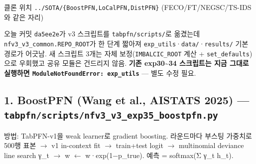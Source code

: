 \par\noindent \textbullet\enspace 클론 위치 \texttt{.\allowbreak{}.\allowbreak{}/\allowbreak{}\allowbreak{}SOTA/\allowbreak{}\allowbreak{}\{\allowbreak{}BoostPF\allowbreak{}N,\allowbreak{}LoCalP\allowbreak{}FN,\allowbreak{}DistP\allowbreak{}FN\}\allowbreak{}} (FECO/\allowbreak{}FT/\allowbreak{}NEGSC/\allowbreak{}TS-IDS와 같은 자리)


\par\noindent \textbullet\enspace [주의] 오늘 커밋 \texttt{da5ee2e}가 v3 스크립트를 \texttt{tabpfn/\allowbreak{}\allowbreak{}s\allowbreak{}cripts/\allowbreak{}\allowbreak{}}로 옮겼는데 \texttt{nfv3\_\allowbreak{}\allowbreak{}v3\_\allowbreak{}\allowbreak{}common.\allowbreak{}R\allowbreak{}EPO\_\allowbreak{}\allowbreak{}ROOT\allowbreak{}}가 한 단계 짧아져 \texttt{exp\_\allowbreak{}\allowbreak{}util\allowbreak{}s}·\texttt{data/\allowbreak{}\allowbreak{}}·\texttt{results/\allowbreak{}\allowbreak{}} 기본 경로가 어긋남. 새 스크립트 3개는 자체 보정(\texttt{IMBALCIC\allowbreak{}\_\allowbreak{}\allowbreak{}ROOT} 계산 +\allowbreak{} \texttt{set\_\allowbreak{}\allowbreak{}defa\allowbreak{}ults})으로 우회했고 공유 모듈은 건드리지 않음. \textbf{기존 exp30\textasciitilde{}34 스크립트는 지금 그대로 실행하면 \texttt{ModuleNo\allowbreak{}tFoundEr\allowbreak{}ror: exp\allowbreak{}\_\allowbreak{}\allowbreak{}utils}} — 별도 수정 필요.


\subsection{1. BoostPFN (Wang et al., AISTATS 2025) — \texttt{tabpfn/\allowbreak{}\allowbreak{}s\allowbreak{}cripts/\allowbreak{}\allowbreak{}n\allowbreak{}fv3\_\allowbreak{}\allowbreak{}v3\_\allowbreak{}\allowbreak{}e\allowbreak{}xp35\_\allowbreak{}\allowbreak{}boo\allowbreak{}stpfn.\allowbreak{}py\allowbreak{}}}
방법: TabPFN-v1을 weak learner로 gradient boosting. 라운드마다 부스팅 가중치로 500행 표본  \ensuremath{\rightarrow}  v1 in-context fit  \ensuremath{\rightarrow}  train+\allowbreak{}test logit  \ensuremath{\rightarrow}  multinomial deviance line search γ\_\allowbreak{}t  \ensuremath{\rightarrow}  w \ensuremath{\leftarrow} w·exp(1−p\_\allowbreak{}true). 예측 =\allowbreak{} softmax(Σ γ\_\allowbreak{}t h\_\allowbreak{}t).

